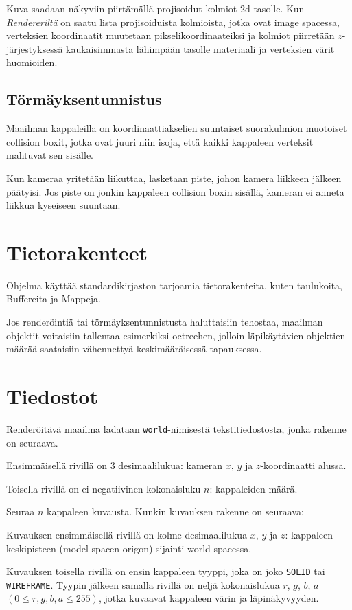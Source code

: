 \documentclass[12pt] {article}
\begin{document}
Kuva saadaan näkyviin piirtämällä projisoidut kolmiot 2d-tasolle. Kun \textit{Rendereriltä} on saatu lista projisoiduista kolmioista, jotka ovat image spacessa, verteksien koordinaatit muutetaan pikselikoordinaateiksi ja kolmiot piirretään $z$-järjestyksessä kaukaisimmasta lähimpään tasolle materiaali ja verteksien värit huomioiden.

\subsection {Törmäyksentunnistus}

Maailman kappaleilla on koordinaattiakselien suuntaiset suorakulmion muotoiset collision boxit, jotka ovat juuri niin isoja, että kaikki kappaleen verteksit mahtuvat sen sisälle.

Kun kameraa yritetään liikuttaa, lasketaan piste, johon kamera liikkeen jälkeen päätyisi. Jos piste on jonkin kappaleen collision boxin sisällä, kameran ei anneta liikkua kyseiseen suuntaan.

\section {Tietorakenteet}

Ohjelma käyttää standardikirjaston tarjoamia tietorakenteita, kuten taulukoita, Buffereita ja Mappeja.

Jos renderöintiä tai törmäyksentunnistusta haluttaisiin tehostaa, maailman objektit voitaisiin tallentaa esimerkiksi octreehen, jolloin läpikäytävien objektien määrää saataisiin vähennettyä keskimääräisessä tapauksessa.

\section {Tiedostot}

Renderöitävä maailma ladataan \texttt{world}-nimisestä tekstitiedostosta, jonka rakenne on seuraava.

Ensimmäisellä rivillä on 3 desimaalilukua: kameran $x$, $y$ ja $z$-koordinaatti alussa.

Toisella rivillä on ei-negatiivinen kokonaisluku $n$: kappaleiden määrä.

Seuraa $n$ kappaleen kuvausta. Kunkin kuvauksen rakenne on seuraava:

Kuvauksen ensimmäisellä rivillä on kolme desimaalilukua $x$, $y$ ja $z$: kappaleen keskipisteen (model spacen origon) sijainti world spacessa.

Kuvauksen toisella rivillä on ensin kappaleen tyyppi, joka on joko \texttt{SOLID} tai \texttt{WIREFRAME}. Tyypin jälkeen samalla rivillä on neljä kokonaislukua $r$, $g$, $b$, $a$ $(0 \leq r, g, b, a \leq 255)$, jotka kuvaavat kappaleen värin ja läpinäkyvyyden.
\end{document}
